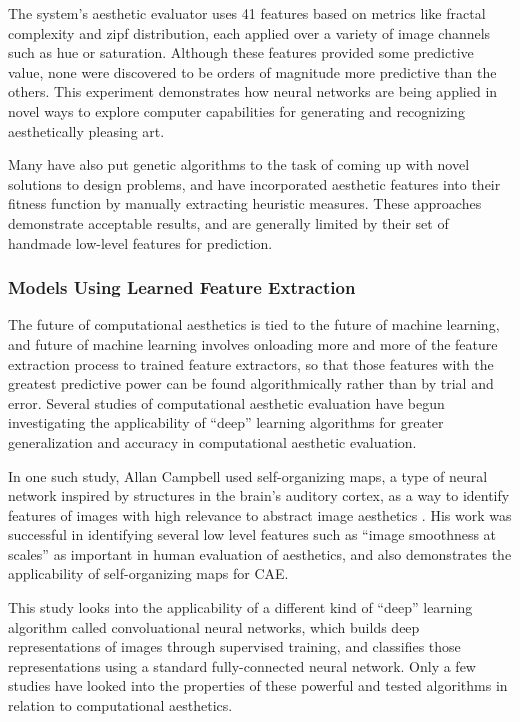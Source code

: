 \documentclass[midd]{thesis}
\begin{document}
The system's aesthetic evaluator uses 41 features based on metrics like fractal complexity and zipf distribution, each applied over a variety of image channels such as hue or saturation. Although these features provided some predictive value, none were discovered to be orders of magnitude more predictive than the others. This experiment demonstrates how neural networks are being applied in novel ways to explore computer capabilities for generating and recognizing aesthetically pleasing art. %

Many have also put genetic algorithms to the task of coming up with novel solutions to design problems, and have incorporated aesthetic features into their fitness function by manually extracting heuristic measures. These approaches demonstrate acceptable results, and are generally limited by their set of handmade low-level features for prediction. %

\subsubsection{Models Using Learned Feature Extraction}

The future of computational aesthetics is tied to the future of machine learning, and future of machine learning involves onloading more and more of the feature extraction process to trained feature extractors, so that those features with the greatest predictive power can be found algorithmically rather than by trial and error. Several studies of computational aesthetic evaluation have begun investigating the applicability of ``deep'' learning algorithms for greater generalization and accuracy in computational aesthetic evaluation. 

In one such study, Allan Campbell used self-organizing maps, a type of neural network inspired by structures in the brain's auditory cortex, as a way to identify features of images with high relevance to abstract image aesthetics \cite{campbell2013self}. His work was successful in identifying several low level features such as ``image smoothness at scales'' as important in human evaluation of aesthetics, and also demonstrates the applicability of self-organizing maps for CAE.

This study looks into the applicability of a different kind of ``deep'' learning algorithm called convoluational neural networks, which builds deep representations of images through supervised training, and classifies those representations using a standard fully-connected neural network. Only a few studies have looked into the properties of these powerful and tested algorithms in relation to computational aesthetics.
\end{document}
